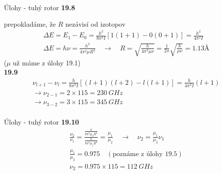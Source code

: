 \documentclass{beamer}
\begin{document}
\begin{frame}{Úlohy - tuhý rotor}
\textbf{19.8}

prepokladáme, že $R$ nezávisí od izotopov
\begin{align*}
\Delta E=E_1-E_0=\frac{h^2}{8\pi^2I}\left[1(1+1)-0(0+1)\right]=\frac{h^2}{4\pi^2I}\\
\Delta E=h\nu=\frac{h^2}{4\pi^2\mu R^2} \quad \rightarrow \quad R=\sqrt{\frac{h}{4\pi^2\mu\nu}}=\frac{1}{2\pi}\sqrt{\frac{h}{\mu\nu}}=1.13\text{\AA}
\end{align*}
($\mu$ už máme z úlohy 19.1)
\\
\textbf{19.9}
\begin{align*}
\nu_{l+1}-\nu_{l}=\frac{h}{8\pi^2I}\left[(l+1)(l+2)-l(l+1)\right]=\frac{h}{4\pi^2I}(l+1)\\
\rightarrow \nu_{2-1}=2\times115=230\: GHz\\
\rightarrow \nu_{3-2}=3\times115=345\: GHz\\
\end{align*}
\end{frame}


\begin{frame}{Úlohy - tuhý rotor}
\textbf{19.10}
\begin{align*}
\frac{\nu_2}{\nu_1}=\frac{\frac{h}{8\pi^2\mu_2R^2}}{\frac{h}{8\pi^2\mu_1R^2}}=\frac{\mu_1}{\mu_2} \quad \rightarrow \quad \nu_2=\frac{\mu_1}{\mu_2} \nu_1\\
\frac{\mu_1}{\mu_2}=0.975 \quad (\text{poznáme z úlohy 19.5})\\
\nu_2=0.975\times115=112\: GHz
\end{align*}
\end{frame}
 
 
\end{document}
